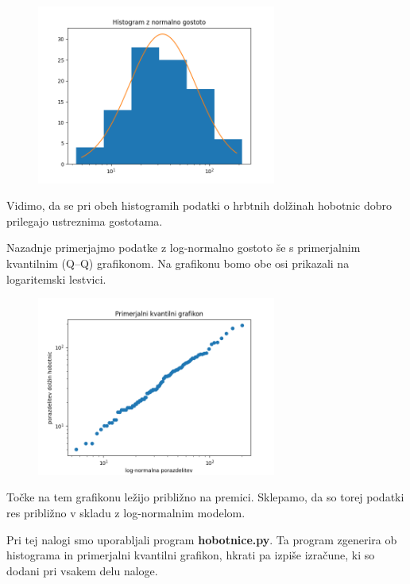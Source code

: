\documentclass[a4paper,12pt]{article}
\theoremstyle{definition}
\theoremstyle{plain}
\begin{document}
\begin{figure}[H]
    \centering
    \label{fig:hist1}
    \includegraphics[width=0.7\textwidth]{Histogram2.png}
\end{figure}

Vidimo, da se pri obeh histogramih podatki o hrbtnih dolžinah hobotnic dobro prilegajo ustreznima gostotama.

Nazadnje primerjajmo podatke z log-normalno gostoto še s primerjalnim kvantilnim (Q–Q) grafikonom. Na grafikonu bomo obe osi prikazali na logaritemski lestvici.

\begin{figure}[H]
    \centering
    \label{fig:hist1}
    \includegraphics[width=0.7\textwidth]{PrimerjalniGrafikon.png}
\end{figure}

Točke na tem grafikonu ležijo približno na premici. Sklepamo, da so torej podatki res približno v skladu z log-normalnim modelom.

Pri tej nalogi smo uporabljali program \textbf{hobotnice.py}. Ta program zgenerira ob histograma in primerjalni kvantilni grafikon, hkrati pa izpiše izračune, ki so dodani pri vsakem delu naloge.
\end{document}
